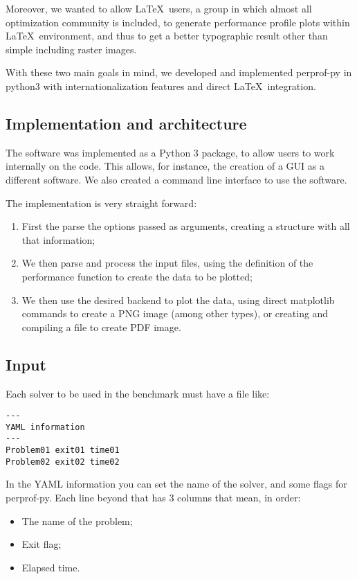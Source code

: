     Moreover,  we wanted to allow \LaTeX\ users, a group in which almost all
    optimization community is included,  to   generate performance profile plots
    within \LaTeX\ environment, and thus to get a better typographic result other
    than simple including raster  images.

    With these two main goals in mind, we developed and implemented perprof-py
    in python3 with internationalization features and direct \LaTeX\ integration.

\subsection*{Implementation and architecture}

    The software was implemented as a Python 3 package, to allow users to work
    internally on the code. This allows, for instance, the creation of a GUI
    as a different software. We also created a command line interface to use the
    software.

    The implementation is very straight forward:
    \begin{enumerate}
      \item First the parse the options passed as arguments, creating a
        structure with all that information;
      \item We then parse and process the input files, using the definition
        of the performance function to create the data to be plotted;
      \item We then use the desired backend to plot the data, using direct
        matplotlib commands to create a PNG image (among other types), or
        creating and compiling a \Latex file to create PDF image.
    \end{enumerate}

\subsection*{Input}

    Each solver to be used in the benchmark must have a file like:

    \begin{verbatim}
---
YAML information
---
Problem01 exit01 time01
Problem02 exit02 time02
    \end{verbatim}

    In the YAML information you can set the name of the solver, and some
    flags for perprof-py.
    Each line beyond that has 3 columns that mean, in order:
    \begin{itemize}
      \item The name of the problem;
      \item Exit flag;
      \item Elapsed time.
    \end{itemize}

